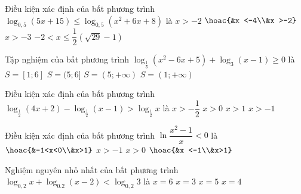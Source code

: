 \begin{ex}%
	Điều kiện xác định của bất phương trình $\log_{0,5}(5x+15)\leq\log_{0,5}\left(x^2+6x+8\right)$ là 
	\choice
	{\True $x >-2$}
	{$\hoac{&x <-4\\&x >-2}$}
	{$x >-3$}
	{$-2<x\leq\dfrac{1}{2}\left(\sqrt{29}-1\right)$}
\end{ex}
\begin{ex}%
	Tập nghiệm của bất phương trình $\log_{\tfrac{1}{3}}\left(x^2-6x+5\right)+\log_3(x-1)\geq 0$ là 
	\choice
	{$S=[1;6]$}
	{\True $S=(5;6]$}
	{$S=(5;+\infty)$}
	{$S=(1;+\infty)$}
\end{ex}
\begin{ex}%
	Điều kiện xác định của bất phương trình $\log_{\tfrac{1}{2}}(4x+2)-\log_{\tfrac{1}{2}}(x-1)>\log_{\tfrac{1}{2}}x$ là 
	\choice
	{$x >-\dfrac{1}{2}$}
	{$x>0$}
	{\True $x>1$}
	{$x >-1$}
\end{ex}
\begin{ex}%
	Điều kiện xác định của bất phương trình $\ln\dfrac{x^2-1}{x}<0$ là 
	\choice
	{\True $\hoac{&-1<x<0\\&x>1}$}
	{$x >-1$}
	{$x>0$}
	{$\hoac{&x <-1\\&x>1}$}
\end{ex}
\begin{ex}%
	Nghiệm nguyên nhỏ nhất của bất phương trình $\log_{0,2}x+\log_{0.2}(x-2)<\log_{0,2}3$ là 
	\choice
	{$x=6$}
	{$x=3$}
	{$x=5$}
	{\True $x=4$}
\end{ex}
